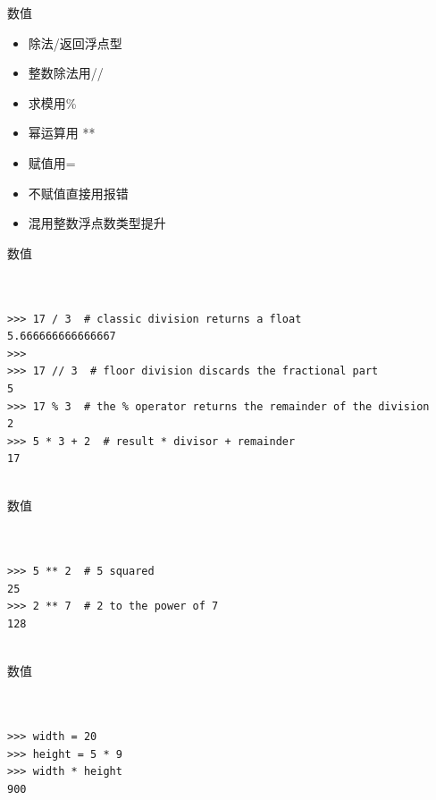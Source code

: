 \documentclass{beamer}
\begin{document}
\begin{frame}[t]{数值}

	\begin{itemize}
		\item 除法/返回浮点型
        \item 整数除法用//
        \item 求模用\%
        \item 幂运算用 **
        \item 赋值用=
        \item 不赋值直接用报错
        \item 混用整数浮点数类型提升
	\end{itemize}

\end{frame}


\begin{frame}[t,fragile]{数值}


\begin{verbatim}


>>> 17 / 3  # classic division returns a float
5.666666666666667
>>>
>>> 17 // 3  # floor division discards the fractional part
5
>>> 17 % 3  # the % operator returns the remainder of the division
2
>>> 5 * 3 + 2  # result * divisor + remainder
17


\end{verbatim}


\end{frame}


\begin{frame}[t,fragile]{数值}


\begin{verbatim}


>>> 5 ** 2  # 5 squared
25
>>> 2 ** 7  # 2 to the power of 7
128


\end{verbatim}


\end{frame}




\begin{frame}[t,fragile]{数值}


\begin{verbatim}


>>> width = 20
>>> height = 5 * 9
>>> width * height
900


\end{verbatim}


\end{frame}
\end{document}

